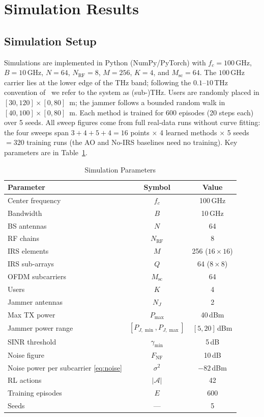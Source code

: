 \documentclass[10pt,conference]{IEEEtran}
\begin{document}
\section{Simulation Results}
\label{sec:results}

\subsection{Simulation Setup}

Simulations are implemented in Python (NumPy/PyTorch) with $f_c = 100\,\text{GHz}$, $B = 10\,\text{GHz}$, $N=64$, $N_{\mathrm{RF}}=8$, $M=256$, $K=4$, and $M_{\mathrm{sc}}=64$. The $100$\,GHz carrier lies at the lower edge of the THz band; following the $0.1$--$10$\,THz convention of~\cite{akyildiz2022thz} we refer to the system as (sub-)THz. Users are randomly placed in $[30,120]\!\times\![0,80]$~m; the jammer follows a bounded random walk in $[40,100]\!\times\![0,80]$~m. Each method is trained for 600 episodes (20 steps each) over 5 seeds. All sweep figures come from full real-data runs without curve fitting: the four sweeps span $3+4+5+4=16$ points $\times$ 4 learned methods $\times$ 5 seeds $= 320$ training runs (the AO and No-IRS baselines need no training). Key parameters are in Table~\ref{tab:params}.

\begin{table}[t]
\centering
\caption{Simulation Parameters}
\label{tab:params}
\begin{tabular}{lcc}
\toprule
\textbf{Parameter} & \textbf{Symbol} & \textbf{Value} \\
\midrule
Center frequency & $f_c$ & 100\,GHz \\
Bandwidth & $B$ & 10\,GHz \\
BS antennas & $N$ & 64 \\
RF chains & $N_{\text{RF}}$ & 8 \\
IRS elements & $M$ & 256 ($16 \times 16$) \\
IRS sub-arrays & $Q$ & 64 ($8 \times 8$) \\
OFDM subcarriers & $M_{\text{sc}}$ & 64 \\
Users & $K$ & 4 \\
Jammer antennas & $N_J$ & 2 \\
Max TX power & $P_{\max}$ & 40\,dBm \\
Jammer power range & $[P_{J,\min}, P_{J,\max}]$ & $[5, 20]$\,dBm \\
SINR threshold & $\gamma_{\min}$ & 5\,dB \\
Noise figure & $F_{\text{NF}}$ & 10\,dB \\
Noise power per subcarrier \eqref{eq:noise} & $\sigma^2$ & $-82$\,dBm \\
RL actions & $|\mathcal{A}|$ & 42 \\
Training episodes & $E$ & 600 \\
Seeds & --- & 5 \\
\bottomrule
\end{tabular}
\end{table}
\end{document}
